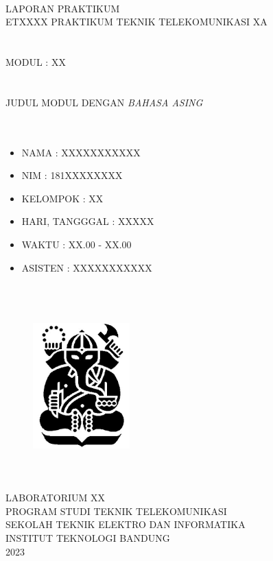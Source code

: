 \documentclass[12pt, a4paper]{article}
\begin{document}
\pagestyle{empty}

\begin{center}
    \hfill\\
    {\fontsize{16}{19.2}\selectfont LAPORAN PRAKTIKUM\\
    ETXXXX PRAKTIKUM TEKNIK TELEKOMUNIKASI XA\\}\hfill\\\hfill\\
    \fontsize{14}{16.8}\selectfont MODUL : XX\\\hfill\\\hfill\\
    \fontsize{16}{19.2}\selectfont JUDUL MODUL DENGAN \textit{BAHASA ASING}\hfill\\\hfill\\\hfill\\
    {\fontsize{12}{14.4}\selectfont \begin{itemize}[leftmargin=5.08cm, rightmargin=0.08cm]
        \item[] NAMA \hspace{22mm} : XXXXXXXXXXX
        \item[] NIM  \hspace{27mm} : 181XXXXXXXX
        \item[] KELOMPOK \hspace{11mm}      : XX
        \item[] HARI, TANGGGAL : XXXXX
        \item[] WAKTU  \hspace{20mm} : XX.00 - XX.00
        \item[] ASISTEN \hspace{18mm} : XXXXXXXXXXX
    \end{itemize}}\hfill\\\hfill\\
    \begin{figure}[htbp]
    \centerline{\includegraphics[height=5.06cm, width=3.73cm]{./Figures/logo.png}}
    \label{fig2}
    \end{figure}\hfill\\\hfill\\
    {\fontsize{14}{16.8}\selectfont
    LABORATORIUM XX\\
    PROGRAM STUDI TEKNIK TELEKOMUNIKASI \\
    SEKOLAH TEKNIK ELEKTRO DAN INFORMATIKA  \\
    INSTITUT TEKNOLOGI BANDUNG\\
    2023\\}
\end{center}
\end{document}
